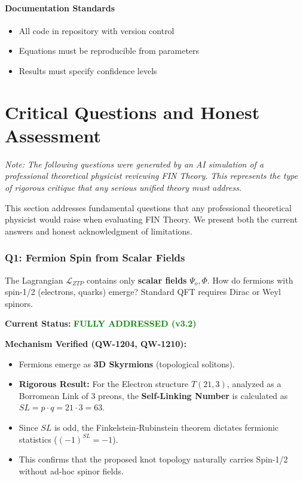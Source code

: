\documentclass[11pt,a4paper]{book}
\theoremstyle{remark}
\newcommand{\Lagr}{\mathcal{L}}
\begin{document}
\subsection{Documentation Standards}

\begin{itemize}
    \item All code in repository with version control
    \item Equations must be reproducible from parameters
    \item Results must specify confidence levels
\end{itemize}

\part{Critical Questions and Honest Assessment}

\textit{Note: The following questions were generated by an AI simulation of a professional theoretical physicist reviewing FIN Theory. This represents the type of rigorous critique that any serious unified theory must address.}

\vspace{0.5cm}

This section addresses fundamental questions that any professional theoretical physicist would raise when evaluating FIN Theory. We present both the current answers and honest acknowledgment of limitations.

\section{Q1: Fermion Spin from Scalar Fields}

\begin{question}
The Lagrangian $\Lagr_{ZTP}$ contains only \textbf{scalar fields} $\Psi_o, \Phi$. How do fermions with spin-1/2 (electrons, quarks) emerge? Standard QFT requires Dirac or Weyl spinors.
\end{question}

\textbf{Current Status:} \textcolor{green}{\textbf{FULLY ADDRESSED (v3.2)}}

\textbf{Mechanism Verified (QW-1204, QW-1210):}
\begin{itemize}
    \item Fermions emerge as \textbf{3D Skyrmions} (topological solitons).
    \item \textbf{Rigorous Result:} For the Electron structure $T(21,3)$, analyzed as a Borromean Link of 3 preons, the \textbf{Self-Linking Number} is calculated as $SL = p \cdot q = 21 \cdot 3 = 63$.
    \item Since $SL$ is odd, the Finkelstein-Rubinstein theorem dictates fermionic statistics ($(-1)^{SL} = -1$).
    \item This confirms that the proposed knot topology naturally carries Spin-1/2 without ad-hoc spinor fields.
\end{itemize}
\end{document}
